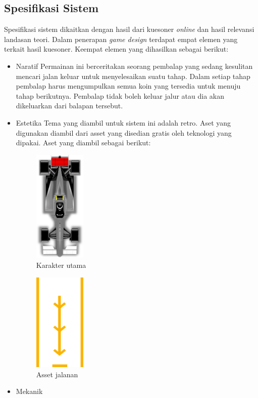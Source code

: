	\subsection{Spesifikasi Sistem}
		Spesifikasi sistem dikaitkan dengan hasil dari kuesoner \textit{online} dan hasil relevansi landasan teori. Dalam penerapan \textit{game design} terdapat empat elemen yang terkait hasil kuesoner. Keempat elemen yang dihasilkan sebagai berikut:
		\begin{itemize}
			\item Naratif
				\subitem Permainan ini berceritakan seorang pembalap yang sedang kesulitan mencari jalan keluar untuk menyelesaikan suatu tahap. Dalam setiap tahap pembalap harus mengumpulkan semua koin yang tersedia untuk menuju tahap berikutnya. Pembalap tidak boleh keluar jalur atau dia akan dikeluarkan dari balapan tersebut.
			\item Estetika
				\subitem Tema yang diambil untuk sistem ini adalah retro. Aset yang digunakan diambil dari asset yang disedian gratis oleh teknologi yang dipakai. Aset yang diambil sebagai berikut:
				\begin{figure}
					\centering
					\includegraphics[width=70pt]{pics/aset/1}
					\caption{Karakter utama}
				\end{figure}
				\begin{figure}
					\centering
					\includegraphics[width=70pt]{pics/aset/2}
					\caption{Asset jalanan}
				\end{figure}
			\item Mekanik

\end{itemize}
